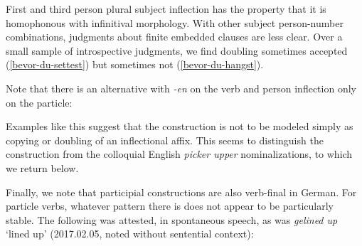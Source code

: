 \documentclass[output=paper]{langscibook}
\begin{document}
\ea
{} 
\z\z 

First and third person plural subject inflection has the property that it is homophonous with infinitival morphology. With other subject person-number combinations, judgments about finite embedded clauses are less clear. Over a small sample of introspective judgments, we find doubling sometimes accepted (\ref{bevor-du-settest}) but sometimes not (\ref{bevor-du-hangst}). 

\ea
{}
\z\z

Note that there is an alternative with \textit{-en} on the verb and person inflection only on the particle:

\ea\label{bevor-du}
\z\z 

Examples like this suggest that the construction is not to be modeled simply as copying or doubling of an inflectional affix. This seems to distinguish the construction from the colloquial English \textit{picker upper} nominalizations, to which we return below.   

Finally, we note that participial constructions are also verb-final in German. For particle verbs, whatever pattern there is does not appear to be  particularly stable. The following was attested, in spontaneous speech, as was \textit{gelined up} `lined up' (2017.02.05, noted without sentential context):
\end{document}
